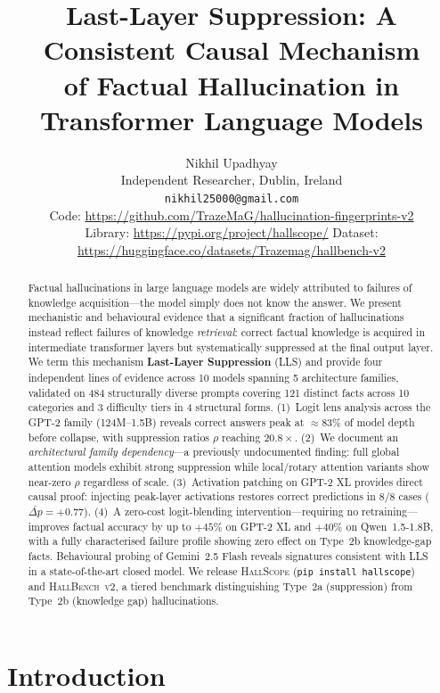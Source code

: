\documentclass{article}
\title{Last-Layer Suppression: A Consistent Causal Mechanism\\
of Factual Hallucination in Transformer Language Models}
\author{%
  Nikhil Upadhyay \\
  Independent Researcher, Dublin, Ireland \\
  \texttt{nikhil25000@gmail.com} \\[4pt]
  \small Code: \url{https://github.com/TrazeMaG/hallucination-fingerprints-v2} \\
  \small Library: \url{https://pypi.org/project/hallscope/} \quad
         Dataset: \url{https://huggingface.co/datasets/Trazemag/hallbench-v2}
}
\begin{document}
\maketitle

\begin{abstract}
Factual hallucinations in large language models are widely attributed to
failures of knowledge acquisition---the model simply does not know the answer.
We present mechanistic and behavioural evidence that a significant fraction
of hallucinations instead reflect failures of knowledge \emph{retrieval}:
correct factual knowledge is acquired in intermediate transformer layers but
systematically suppressed at the final output layer. We term this mechanism
\textbf{Last-Layer Suppression} (LLS) and provide four independent lines of
evidence across 10 models spanning 5 architecture families, validated on
484 structurally diverse prompts covering 121 distinct facts across 10
categories and 3 difficulty tiers in 4 structural forms.
(1)~Logit lens analysis across the GPT-2 family (124M--1.5B) reveals correct
answers peak at $\approx 83\%$ of model depth before collapse, with
suppression ratios $\rho$ reaching $20.8\times$.
(2)~We document an \emph{architectural family dependency}---a previously
undocumented finding: full global attention models exhibit strong suppression
while local/rotary attention variants show near-zero $\rho$ regardless of
scale.
(3)~Activation patching on GPT-2 XL provides direct causal proof: injecting
peak-layer activations restores correct predictions in 8/8 cases
($\bar{\Delta p} = +0.77$).
(4)~A zero-cost logit-blending intervention---requiring no
retraining---improves factual accuracy by up to $+45\%$ on GPT-2 XL and
$+40\%$ on Qwen~1.5-1.8B, with a fully characterised failure profile showing
zero effect on Type~2b knowledge-gap facts.
Behavioural probing of Gemini~2.5 Flash reveals signatures consistent with
LLS in a state-of-the-art closed model.
We release \textsc{HallScope} (\texttt{pip install hallscope}) and
\textsc{HallBench~v2}, a tiered benchmark distinguishing Type~2a (suppression)
from Type~2b (knowledge gap) hallucinations.
\end{abstract}

\section{Introduction}
\end{document}

